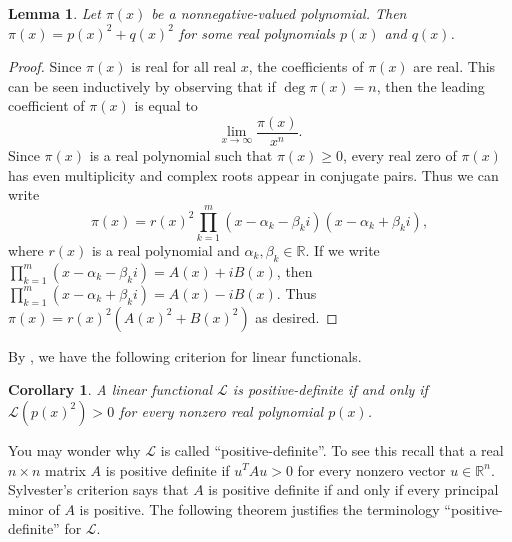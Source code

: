\documentclass[oneside]{book}
\numberwithin{equation}{section}
\newtheorem{lem}[thm]{Lemma}
\newtheorem{cor}[thm]{Corollary}
\theoremstyle{definition}
\newcommand{\RR}{\mathbb{R}}
\newcommand\LL{\mathcal{L}}
\begin{document}
\begin{lem}\label{lem:pi=p2+q2}
  Let \( \pi(x) \) be a nonnegative-valued polynomial. Then
  \( \pi(x) = p(x)^2 + q(x)^2 \) for some real polynomials \( p(x) \)
  and \( q(x) \).
\end{lem}
\begin{proof}
  Since \( \pi(x) \) is real for all real \( x \), the coefficients of
  \( \pi(x) \) are real. This can be seen inductively by observing
  that if \( \deg \pi(x) =n \), then the leading coefficient of
  \( \pi(x) \) is equal to
  \[
    \lim_{x\to \infty} \frac{\pi(x)}{x^n}.
  \]
  Since \( \pi(x) \) is a real polynomial such that \( \pi(x)\ge0 \),
  every real zero of \( \pi(x) \) has even multiplicity and complex
  roots appear in conjugate pairs. Thus we can write
  \[
    \pi(x) = r(x)^2 \prod_{k=1}^{m} (x-\alpha_k-\beta_ki)(x-\alpha_k+\beta_ki),
  \]
  where \( r(x) \) is a real polynomial and
  \( \alpha_k,\beta_k\in \RR \).
  If we write \( \prod_{k=1}^{m} (x-\alpha_k-\beta_ki) = A(x)+iB(x) \),
  then \( \prod_{k=1}^{m} (x-\alpha_k+\beta_ki) = A(x)-iB(x) \).
  Thus \( \pi(x) = r(x)^2(A(x)^2+B(x)^2) \) as desired.
\end{proof}

By , we have the following criterion for linear
functionals.
\begin{cor}\label{cor:pos-def-sq}
  A linear functional \( \LL \) is positive-definite if and only if
  \( \LL(p(x)^2)>0 \) for every nonzero real polynomial \( p(x) \).
\end{cor}



You may wonder why \( \LL \) is called ``positive-definite''. To see
this recall that a real \( n\times n \) matrix \( A \) is positive
definite if \( u^T A u >0 \) for every nonzero vector
\( u\in \RR^n \). Sylvester's criterion says that \( A \) is positive
definite if and only if every principal minor of \( A \) is positive.
The following theorem justifies the terminology ``positive-definite''
for \( \LL \).
\end{document}
